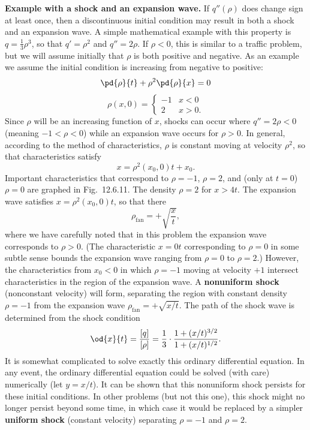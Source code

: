 \textbf{Example with a shock and an expansion wave.}  If $q''(\rho)$ does change sign at least once, then a discontinuous initial condition may result in both a shock and an expansion wave.  A simple mathematical example with this property is $q = \frac{1}{3}\rho^3$, so that $q' = \rho^2$ and $q'' = 2\rho$.  If $\rho < 0$, this is similar to a traffic problem, but we will assume initially that $\rho$ is both positive and negative.  As an example we assume the initial condition is increasing from negative to positive:
\[
\pd{\rho}{t} + \rho^2\pd{\rho}{x} = 0
\]
\[
\rho(x,0) = \begin{cases} -1 & x < 0 \\ 2 & x > 0. \end{cases}
\]
Since $\rho$ will be an increasing function of $x$, shocks can occur where $q'' = 2\rho < 0$ (meaning $-1 < \rho < 0$) while an expansion wave occurs for $\rho > 0$.  In general, according to the method of characteristics, $\rho$ is constant moving at velocity $\rho^2$, so that characteristics satisfy
\[
x = \rho^2(x_0,0)t + x_0.
\]
Important characteristics that correspond to $\rho = -1$, $\rho = 2$, and (only at $t = 0$) $\rho = 0$ are graphed in Fig.~12.6.11.  The density $\rho = 2$ for $x > 4t$.  The expansion wave satisfies $x = \rho^2(x_0,0)t$, so that there
\[
\rho_{\text{fan}} = +\sqrt{\frac{x}{t}},
\]
where we have carefully noted that in this problem the expansion wave corresponds to $\rho > 0$.  (The characteristic $x = 0t$ corresponding to $\rho = 0$ in some subtle sense bounds the expansion wave ranging from $\rho = 0$ to $\rho = 2$.)  However, the characteristics from $x_0 < 0$ in which $\rho = -1$ moving at velocity $+1$ intersect characteristics in the region of the expansion wave.  A \textbf{nonuniform shock} (nonconstant velocity) will form, separating the region with constant density $\rho = -1$ from the expansion wave $\rho_{\text{fan}} = +\sqrt{x/t}$.  The path of the shock wave is determined from the shock condition
\[
\od{x}{t} = \frac{[q]}{[\rho]} = \frac{1}{3}\cdot\frac{1 + (x/t)^{3/2}}{1 + (x/t)^{1/2}}.
\]
It is somewhat complicated to solve exactly this ordinary differential equation.  In any event, the ordinary differential equation could be solved (with care) numerically (let $y = x/t$).  It can be shown that this nonuniform shock persists for these initial conditions.  In other problems (but not this one), this shock might no longer persist beyond some time, in which case it would be replaced by a simpler \textbf{uniform shock} (constant velocity) separating $\rho = -1$ and $\rho = 2$.

